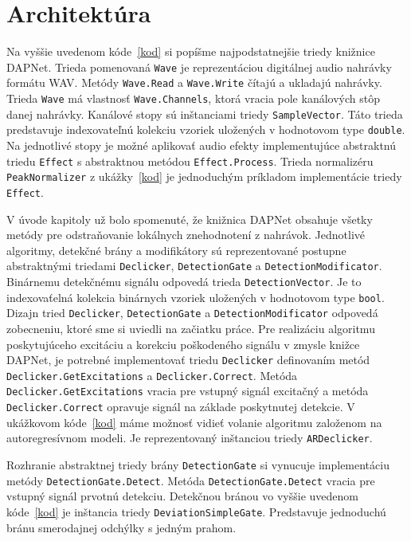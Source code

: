 \section{Architektúra}
Na vyššie uvedenom kóde~\ref{kod} si popíšme najpodstatnejšie triedy knižnice DAPNet. Trieda pomenovaná \texttt{Wave} je reprezentáciou digitálnej audio nahrávky formátu WAV. Metódy \texttt{Wave.Read} a \texttt{Wave.Write} čítajú a ukladajú nahrávky. Trieda \texttt{Wave} má vlastnosť \texttt{Wave.Channels}, ktorá vracia pole kanálových stôp danej nahrávky. Kanálové stopy sú inštanciami triedy \texttt{SampleVector}. Táto trieda predstavuje indexovateľnú kolekciu vzoriek uložených v hodnotovom type \texttt{double}. Na jednotlivé stopy je možné aplikovať audio efekty implementujúce abstraktnú triedu \texttt{Effect} s abstraktnou metódou \texttt{Effect.Process}. Trieda normalizéru \texttt{PeakNormalizer} z ukážky~\ref{kod} je jednoduchým príkladom implementácie triedy \texttt{Effect}. 

V úvode kapitoly už bolo spomenuté, že knižnica DAPNet obsahuje všetky metódy pre odstraňovanie lokálnych znehodnotení z nahrávok. Jednotlivé algoritmy, detekčné brány a modifikátory sú reprezentované postupne abstraktnými triedami \texttt{Declicker}, \texttt{DetectionGate} a \texttt{DetectionModificator}. Binárnemu detekčnému signálu odpovedá trieda \texttt{DetectionVector}. Je to indexovaťelná kolekcia binárnych vzoriek uložených v hodnotovom type \texttt{bool}. Dizajn tried \texttt{Declicker}, \texttt{DetectionGate} a \texttt{DetectionModificator} odpovedá zobecneniu, ktoré sme si uviedli na začiatku práce. Pre realizáciu algoritmu poskytujúceho excitáciu a korekciu poškodeného signálu v zmysle knižce DAPNet, je potrebné implementovať triedu \texttt{Declicker} definovaním metód \texttt{Declicker.GetExcitations} a \texttt{Declicker.Correct}. Metóda \texttt{Declicker.GetExcitations} vracia pre vstupný signál excitačný a metóda \texttt{Declicker.Correct} opravuje signál na základe poskytnutej detekcie. V ukážkovom kóde~\ref{kod} máme možnosť vidieť volanie algoritmu založenom na autoregresívnom modeli. Je reprezentovaný inštanciou triedy \texttt{ARDeclicker}. 

Rozhranie abstraktnej triedy brány \texttt{DetectionGate} si vynucuje implementáciu metódy \texttt{DetectionGate.Detect}. Metóda \texttt{DetectionGate.Detect} vracia pre vstupný signál prvotnú detekciu. Detekčnou bránou vo vyššie uvedenom kóde~\ref{kod} je inštancia triedy \texttt{DeviationSimpleGate}. Predstavuje jednoduchú bránu smerodajnej odchýlky s jedným prahom. 

